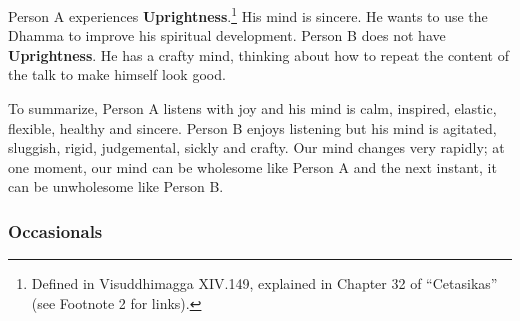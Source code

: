 Person A experiences \textbf{Uprightness}.\footnote{Defined in Visuddhimagga XIV.149, explained in Chapter 32 of “Cetasikas” (see Footnote 2 for links).} His mind is sincere. He wants to use the Dhamma to improve his spiritual development. Person B does not have \textbf{Uprightness}. He has a crafty mind, thinking about how to repeat the content of the talk to make himself look good.

To summarize, Person A listens with joy and his mind is calm, inspired, elastic, flexible, healthy and sincere. Person B enjoys listening but his mind is agitated, sluggish, rigid, judgemental, sickly and crafty. Our mind changes very rapidly; at one moment, our mind can be wholesome like Person A and the next instant, it can be unwholesome like Person B.

\subsubsection*{Occasionals}

